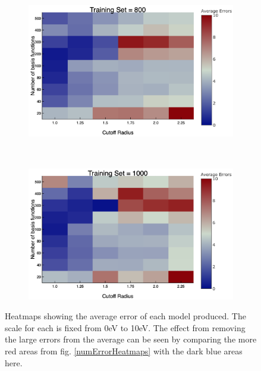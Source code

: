 \begin{figure}
\begin{subfigure}{0.5\textwidth}
    \caption{} 
    \label{aveErrors6}
  \end{subfigure}%
    \hspace*{\fill}   %
  \begin{subfigure}{0.5\textwidth}
    \includegraphics[width=\linewidth]{Figures/aveErrors8}
    \caption{} 
    \label{aveErrors8}
  \end{subfigure}%
    \\
  \begin{subfigure}{0.5\textwidth}
    \includegraphics[width=\linewidth]{Figures/aveErrors10}
    \caption{} 
    \label{aveErrors10}
  \end{subfigure}%
\caption{Heatmaps showing the average error of each model produced. The scale for each is fixed from 0eV to 10eV. The effect from removing the large errors from the average can be seen by comparing the more red areas from fig. \ref{numErrorHeatmaps} with the dark blue areas here.}
\label{aveErrorHeatmaps}
\end{figure}


